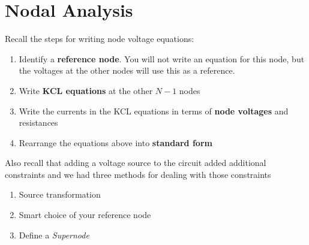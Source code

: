 \documentclass{handout}
\begin{document}

\newpage
\clearpage
\pagebreak

\section{Nodal Analysis}
Recall the steps for writing node voltage equations:
\begin{enumerate}
\item Identify a \textbf{reference node}.  You will not write an equation for this node, but the voltages at the other nodes will use this as a reference.
\item Write \textbf{KCL equations} at the other $N-1$ nodes
\item Write the currents in the KCL equations in terms of \textbf{node voltages} and resistances
\item Rearrange the equations above into \textbf{standard form}
\end{enumerate}

Also recall that adding a voltage source to the circuit added additional constraints and we had three methods for dealing with those constraints
\begin{enumerate}
\item Source transformation
\item Smart choice of your reference node
\item Define a {\em Supernode}
\end{enumerate}
\end{document}

